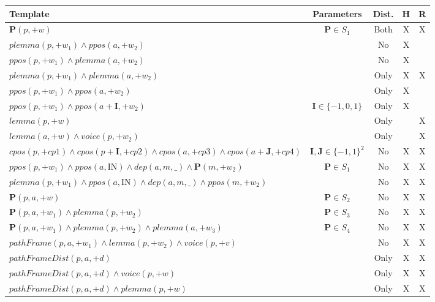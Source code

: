 \begin{table*}[th]
\centering
\begin{tabular}{|>{\small}p{10cm}|>{\small}c|>{\small}c|>{\small}c|>{\small}c|}\hline
 Template               & Parameters & Dist. & H & R \\\hline\hline
   $ \mathbf{P}(p,+w)         $    & $\mathbf{P} \in S_1$   & Both & X & X \\\hline
   $ plemma (p,+w_1) \land ppos(a,+w_2) $   & & No    & X &  \\\hline
   $ ppos(p,+w_1) \land plemma(a,+w_2)  $   & & No    & X &  \\\hline
   $ plemma(p,+w_1) \land plemma(a,+w_2)$   & & Only  & X & X \\\hline
   $ ppos(p,+w_1) \land ppos(a,+w_2)$       & & Only  & X &   \\\hline
   $ ppos(p,+w_1) \land ppos(a+\mathbf{I},+w_2)$     & $\mathbf{I} \in \{-1,0,1\}$ & Only& X &   \\\hline
   $ lemma(p,+w)$ & & Only & & X  \\\hline
   $ lemma(a,+w) \land voice(p,+w_2)$ & & Only & & X  \\\hline
   $ cpos(p,+cp1) \land cpos(p+\mathbf{I},+cp2) \land cpos(a,+cp3) \land cpos(a+\mathbf{J},+cp4)$ & $\mathbf{I},\mathbf{J} \in \{-1,1\}^2$ & No & X & X\\\hline
   $ ppos(p,+w_1) \land ppos(a,\text{IN}) \land dep(a,m,\_) \land \mathbf{P}(m,+w_2) $ & $\mathbf{P} \in S_1$ & No & X &  X \\\hline
   $ plemma(p,+w_1) \land ppos(a,\text{IN}) \land dep(a,m,\_) \land ppos(m,+w_2) $ & & No & X &  X \\\hline
   $ \mathbf{P}(p,a,+w)         $    & $\mathbf{P} \in S_2$ & No & X & X \\\hline
   $ \mathbf{P}(p,a,+w_1) \land plemma(p,+w_2) $ & $\mathbf{P} \in S_3$           & No  & X & X \\\hline
   $ \mathbf{P}(p,a,+w_1) \land plemma(p,+w_2) \land plemma(a,+w_3) $    &   $\mathbf{P} \in S_4$ & No  & X & X \\\hline
   $ pathFrame(p,a,+w_1) \land lemma(p,+w_2) \land voice(p,+v) $ &      & No      & X & X \\\hline
   $ pathFrameDist(p,a,+d) $      &  & Only   & X & X \\\hline
   $ pathFrameDist(p,a,+d) \land voice(p,+w) $ &  & Only           & X & X \\\hline
   $ pathFrameDist(p,a,+d) \land plemma(p,+w)$ &  & Only           & X & X \\\hline

\end{tabular}
\end{table*}

